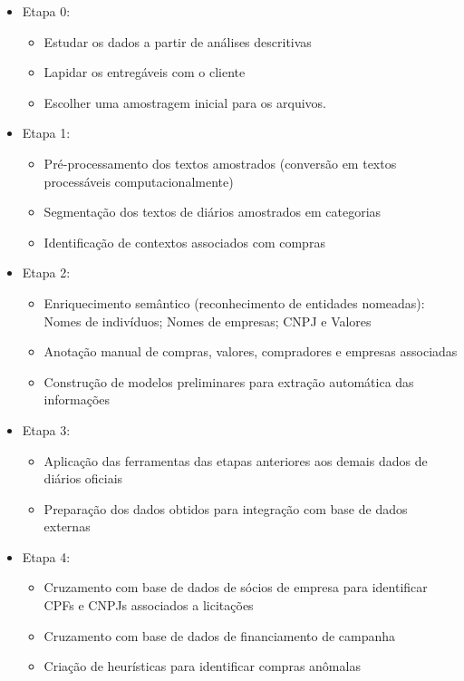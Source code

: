 \documentclass[10pt, a4paper]{article}
\begin{document}
\begin{itemize}
    \item Etapa 0:
    \begin{itemize}
        \item Estudar os dados a partir de análises descritivas
        \item Lapidar os entregáveis com o cliente
        \item Escolher uma amostragem inicial para os arquivos. 
    \end{itemize}
    \item Etapa 1:
    \begin{itemize}
        \item Pré-processamento dos textos amostrados (conversão em textos processáveis computacionalmente)
        \item Segmentação dos textos de diários amostrados em categorias
        \item Identificação de contextos associados com compras
    \end{itemize}
     \item Etapa 2:
    \begin{itemize}
        \item Enriquecimento semântico (reconhecimento de entidades nomeadas): Nomes de indivíduos; Nomes de empresas; CNPJ e Valores
        \item Anotação manual de compras, valores, compradores e empresas associadas
        \item Construção de modelos preliminares para extração automática das informações
    \end{itemize}
    \item Etapa 3:
    \begin{itemize}
        \item Aplicação das ferramentas das etapas anteriores aos demais dados de diários oficiais
        \item Preparação dos dados obtidos para integração com base de dados externas
    \end{itemize}
    \item Etapa 4:
    \begin{itemize}
        \item Cruzamento com base de dados de sócios de empresa para identificar CPFs e CNPJs associados a licitações
        \item Cruzamento com base de dados de financiamento de campanha
        \item Criação de heurísticas para identificar compras anômalas
    \end{itemize}
\end{itemize}
\end{document}
